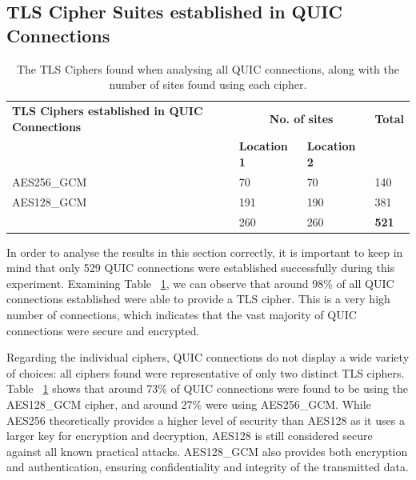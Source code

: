 \documentclass{l4proj}
\begin{document}
\subsection{TLS Cipher Suites established in QUIC Connections}

\begin{table}[hbtp]
    \centering
    \caption{The TLS Ciphers found when analysing all QUIC connections, along with the number of sites found using each cipher.}\label{tab:TLSCiphers_QUIC}
    \begin{tabular}{lll|l}
    \textbf{TLS Ciphers established in QUIC Connections}                                & \multicolumn{2}{c|}{\textbf{No. of sites}}  & \textbf{Total} \\ 
    \textbf{}                                           & \textbf{Location 1} & \textbf{Location 2}         \\ \hline %
    AES256\_GCM          & 70                  & 70                  & 140            \\
    AES128\_GCM          & 191                 & 190                 & 381            \\ \hline
                         & 260                 & 260                 & \textbf{521}  
    \end{tabular}
\end{table}


In order to analyse the results in this section correctly, it is important to keep in mind that only 529 QUIC connections were established successfully during this experiment. Examining Table ~\ref{tab:TLSCiphers_QUIC}, we can observe that around 98\% of all QUIC connections established were able to provide a TLS cipher. This is a very high number of connections, which indicates that the vast majority of QUIC connections were secure and encrypted.

Regarding the individual ciphers, QUIC connections do not display a wide variety of choices: all ciphers found were representative of only two distinct TLS ciphers. Table ~\ref{tab:TLSCiphers_QUIC} shows that around 73\% of QUIC connections were found to be using the AES128\_GCM cipher, and around 27\% were using AES256\_GCM. While AES256 theoretically provides a higher level of security than AES128 as it uses a larger key for encryption and decryption, AES128 is still considered secure against all known practical attacks. AES128\_GCM also provides both encryption and authentication, ensuring confidentiality and integrity of the transmitted data.
\end{document}
